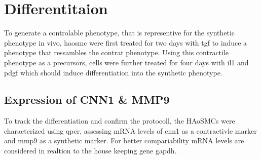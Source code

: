 \section{Differentitaion}
\label{sec:differentiation}
To generate a controlable phenotype, that is representive for the synthetic phenotype in vivo, \ac{haosmc} were first treated for two days with \ac{tgf} to induce a phenotype that ressambles the contrat phenotype. Using this contractile phenotype as a precursors, cells were further treated for four days with \ac{il1} and \ac{pdgf} which should induce differentiation into the synthetic phenotype.

    \subsection{Expression of CNN1 \& MMP9}
    To track the differentiation and confirm the protocoll, the HAoSMCs were characterized using \ac{qpcr}, assessing mRNA levels of \ac{cnn1} as a contractivle marker and \ac{mmp9} as a synthetic marker. For better compariability mRNA levels are considered in realtion to the house keeping gene \ac{gapdh}.

